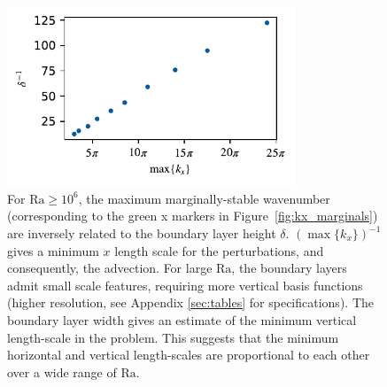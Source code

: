 \documentclass[reprint,amsmath,amssymb,aps,nofootinbib]{revtex4-1}
\newcommand\Ra{\mathrm{Ra}}
\begin{document}
\begin{figure}
    \centering
    \includegraphics[width=3.4in]{del_kx_inv.pdf}
    \caption{For $\Ra \geq 10^6$, the maximum marginally-stable wavenumber (corresponding to the green x markers in Figure~\ref{fig:kx_marginals}) are inversely related to the boundary layer height $\delta$. 
    $(\max \{ k_x \})^{-1}$ gives a minimum $x$ length scale for the perturbations, and consequently, the advection. 
    For large $\Ra$, the boundary layers admit small scale features, requiring more vertical basis functions (higher resolution, see Appendix \ref{sec:tables} for specifications).
    The boundary layer width gives an estimate of the minimum vertical length-scale in the problem.
    This suggests that the minimum horizontal and vertical length-scales are proportional to each other over a wide range of $\Ra$.}
    \label{fig:del_inv}
\end{figure}
\end{document}
